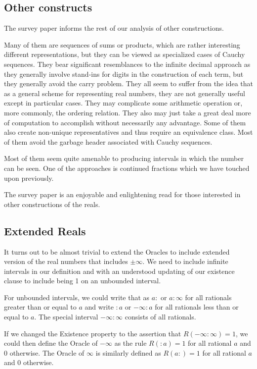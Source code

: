 \documentclass[12pt]{article}
\theoremstyle{remark}
\begin{document}
\subsection{Other constructs}

The survey paper \cite{ittay-2015} informs the rest of our analysis of other constructions. 

Many of them are sequences of sums or products, which are rather interesting different representations, but they can be viewed as specialized cases of Cauchy sequences. They bear significant resemblances to the infinite decimal approach as they generally involve stand-ins for digits in the construction of each term, but they generally avoid the carry problem. They all seem to suffer from the idea that as a general scheme for representing real numbers, they are not generally useful except in particular cases. They may complicate some arithmetic operation or, more commonly, the ordering relation. They also may just take a great deal more of computation to accomplish without necessarily any advantage. Some of them also create non-unique representatives and thus require an equivalence class. Most of them avoid the garbage header associated with Cauchy sequences. 

Most of them seem quite amenable to producing intervals in which the number can be seen. One of the approaches is continued fractions which we have touched upon previously. 

The survey paper is an enjoyable and enlightening read for those interested in other constructions of the reals. 

\subsection{Extended Reals}

It turns out to be almost trivial to extend the Oracles to include extended version of the real numbers that includes $\pm \infty$. We need to include infinite intervals in our definition and with an understood updating of our existence clause to include being 1 on an unbounded interval.

For unbounded intervals, we could write that as $a:$ or $a:\infty$ for all rationals greater than or equal to $a$ and write $:a$ or $-\infty:a$ for all rationals less than or equal to $a$. The special interval $-\infty:\infty$ consists of all rationals. 

If we changed the Existence property to the assertion that $R(-\infty:\infty)=1$, we could then define the Oracle of $-\infty$ as the rule $R(:a) = 1$ for all rational $a$ and 0 otherwise. The Oracle of $\infty$ is similarly defined as $R(a:)=1$  for all rational $a$ and 0 otherwise. 
\end{document}
